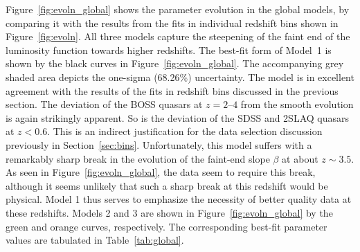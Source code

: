 \documentclass[fleqn,usenatbib]{mnras}
\begin{document}
Figure~\ref{fig:evoln_global} shows the parameter evolution in the
global models, by comparing it with the results from the fits in
individual redshift bins shown in Figure~\ref{fig:evoln}.  All three
models capture the steepening of the faint end of the luminosity
function towards higher redshifts.  The best-fit form of Model~1 is
shown by the black curves in Figure~\ref{fig:evoln_global}.  The
accompanying grey shaded area depicts the one-sigma (68.26\%)
uncertainty.  The model is in excellent agreement with the results of
the fits in redshift bins discussed in the previous section.
The
deviation of the BOSS quasars at $z=2$--$4$ from the smooth evolution
is again strikingly apparent.  So is
the deviation of the SDSS and
2SLAQ quasars at $z<0.6$.  This is an indirect justification for the
data selection discussion previously in Section~\ref{sec:bins}.
Unfortunately, this model suffers
with a remarkably sharp break in the
evolution of the faint-end slope $\beta$ at about $z\sim 3.5$.  As
seen in Figure~\ref{fig:evoln_global}, the data seem to require this
break, although it seems unlikely that such a sharp break at this
redshift would be physical.  Model 1 thus serves to emphasize the
necessity of better quality data at these redshifts.  Models 2 and 3
are shown in Figure~\ref{fig:evoln_global} by the green and orange
curves, respectively.  The corresponding best-fit parameter values are
tabulated in Table~\ref{tab:global}.
\end{document}
